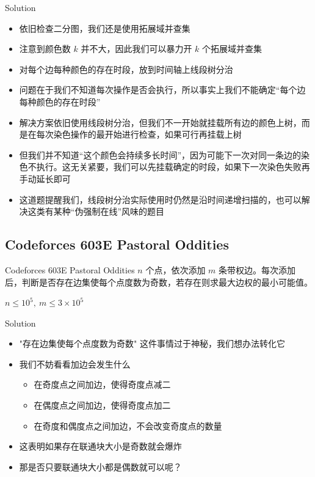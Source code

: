 ﻿\documentclass[aspectratio=169,handout]{ctexbeamer}
\begin{document}
\begin{frame}{Solution}
    \begin{itemize}
        \item 依旧检查二分图，我们还是使用拓展域并查集
        \item 注意到颜色数 $k$ 并不大，因此我们可以暴力开 $k$ 个拓展域并查集
        \item 对每个边每种颜色的存在时段，放到时间轴上线段树分治    
        \item 问题在于我们不知道每次操作是否会执行，所以事实上我们不能确定“每个边每种颜色的存在时段”
        \item 解决方案依旧使用线段树分治，但我们不一开始就挂载所有边的颜色上树，而是在每次染色操作的最开始进行检查，如果可行再挂载上树
        \item 但我们并不知道“这个颜色会持续多长时间”，因为可能下一次对同一条边的染色不执行。这无关紧要，我们可以先挂载确定的时段，如果下一次染色失败再手动延长即可
        \item 这道题提醒我们，线段树分治实际使用时仍然是沿时间递增扫描的，也可以解决这类有某种“伪强制在线”风味的题目
    \end{itemize}
\end{frame}







\subsection{Codeforces 603E Pastoral Oddities}
\begin{frame}{Codeforces 603E Pastoral Oddities}
    $n$ 个点，依次添加 $m$ 条带权边。每次添加后，判断是否存在边集使每个点度数为奇数，若存在则求最大边权的最小可能值。
    
    $n\le 10^5,\ m\le 3\times10^5$
\end{frame}

\begin{frame}{Solution}
    \begin{itemize}
        \item "存在边集使每个点度数为奇数" 这件事情过于神秘，我们想办法转化它
        \item 我们不妨看看加边会发生什么
        \begin{itemize}
            \item 在奇度点之间加边，使得奇度点减二
            \item 在偶度点之间加边，使得奇度点加二
            \item 在奇度和偶度点之间加边，不会改变奇度点的数量
        \end{itemize}
        \item 这表明如果存在联通块大小是奇数就会爆炸
        \item 那是否只要联通块大小都是偶数就可以呢？
    \end{itemize}
\end{frame}
\end{document}
